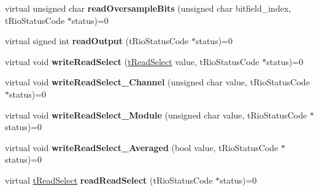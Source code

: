 \begin{DoxyCompactItemize}
\item 
\hypertarget{classnFPGA_1_1nFRC__2012__1__6__4_1_1tAI_aac928814777d8f171b3ada495d3f0879}{
virtual unsigned char {\bfseries readOversampleBits} (unsigned char bitfield\_\-index, tRioStatusCode $\ast$status)=0}
\label{classnFPGA_1_1nFRC__2012__1__6__4_1_1tAI_aac928814777d8f171b3ada495d3f0879}

\item 
\hypertarget{classnFPGA_1_1nFRC__2012__1__6__4_1_1tAI_a5e48bafe8b2246b522c40021cea3313d}{
virtual signed int {\bfseries readOutput} (tRioStatusCode $\ast$status)=0}
\label{classnFPGA_1_1nFRC__2012__1__6__4_1_1tAI_a5e48bafe8b2246b522c40021cea3313d}

\item 
\hypertarget{classnFPGA_1_1nFRC__2012__1__6__4_1_1tAI_a38aeb2d9175e0e34d871b7fe3adbfa0a}{
virtual void {\bfseries writeReadSelect} (\hyperlink{unionnFPGA_1_1nFRC__2012__1__6__4_1_1tAI_1_1tReadSelect}{tReadSelect} value, tRioStatusCode $\ast$status)=0}
\label{classnFPGA_1_1nFRC__2012__1__6__4_1_1tAI_a38aeb2d9175e0e34d871b7fe3adbfa0a}

\item 
\hypertarget{classnFPGA_1_1nFRC__2012__1__6__4_1_1tAI_a16a2566d89b67d4e27b354f9780abfd6}{
virtual void {\bfseries writeReadSelect\_\-Channel} (unsigned char value, tRioStatusCode $\ast$status)=0}
\label{classnFPGA_1_1nFRC__2012__1__6__4_1_1tAI_a16a2566d89b67d4e27b354f9780abfd6}

\item 
\hypertarget{classnFPGA_1_1nFRC__2012__1__6__4_1_1tAI_abacc2e5ed23419214cc11356934c124c}{
virtual void {\bfseries writeReadSelect\_\-Module} (unsigned char value, tRioStatusCode $\ast$status)=0}
\label{classnFPGA_1_1nFRC__2012__1__6__4_1_1tAI_abacc2e5ed23419214cc11356934c124c}

\item 
\hypertarget{classnFPGA_1_1nFRC__2012__1__6__4_1_1tAI_a22327784c345e21c09010f8a020cdf4f}{
virtual void {\bfseries writeReadSelect\_\-Averaged} (bool value, tRioStatusCode $\ast$status)=0}
\label{classnFPGA_1_1nFRC__2012__1__6__4_1_1tAI_a22327784c345e21c09010f8a020cdf4f}

\item 
\hypertarget{classnFPGA_1_1nFRC__2012__1__6__4_1_1tAI_ac89353f51c105d1a12824c89aa52a061}{
virtual \hyperlink{unionnFPGA_1_1nFRC__2012__1__6__4_1_1tAI_1_1tReadSelect}{tReadSelect} {\bfseries readReadSelect} (tRioStatusCode $\ast$status)=0}
\label{classnFPGA_1_1nFRC__2012__1__6__4_1_1tAI_ac89353f51c105d1a12824c89aa52a061}


\end{DoxyCompactItemize}
